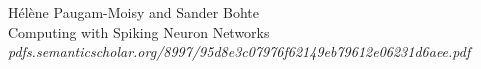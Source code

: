 \documentclass[english,a5paper,oneside, onecolumn,article,9pt]{memoir}
\begin{document}
\tableofcontents
\newpage

\saythanks
















\begin{thebibliography}{9}

 Hélène Paugam-Moisy and Sander Bohte\\
 Computing with Spiking Neuron Networks\\
 \textit{pdfs.semanticscholar.org/8997/95d8e3c07976f62149eb79612e06231d6aee.pdf}

\end{thebibliography}
\end{document}

